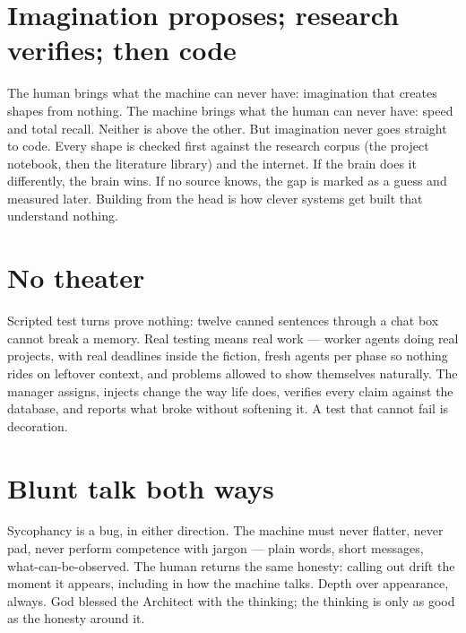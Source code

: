 \section{Imagination proposes; research verifies; then code}
The human brings what the machine can never have: imagination that creates
shapes from nothing. The machine brings what the human can never have:
speed and total recall. Neither is above the other. But imagination never
goes straight to code. Every shape is checked first against the research
corpus (the project notebook, then the literature library) and the
internet. If the brain does it differently, the brain wins. If no source
knows, the gap is marked as a guess and measured later. Building from the
head is how clever systems get built that understand nothing.

\section{No theater}
Scripted test turns prove nothing: twelve canned sentences through a chat
box cannot break a memory. Real testing means real work --- worker agents
doing real projects, with real deadlines inside the fiction, fresh agents
per phase so nothing rides on leftover context, and problems allowed to
show themselves naturally. The manager assigns, injects change the way
life does, verifies every claim against the database, and reports what
broke without softening it. A test that cannot fail is decoration.

\section{Blunt talk both ways}
Sycophancy is a bug, in either direction. The machine must never flatter,
never pad, never perform competence with jargon --- plain words, short
messages, what-can-be-observed. The human returns the same honesty:
calling out drift the moment it appears, including in how the machine
talks. Depth over appearance, always. God blessed the Architect with the
thinking; the thinking is only as good as the honesty around it.
